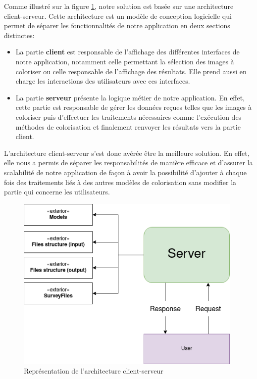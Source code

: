 \documentclass{article}
\begin{document}
Comme illustré sur la figure \ref{fig:clientserver}, notre solution est basée sur une architecture client-serveur. 
Cette architecture est un modèle de conception logicielle qui permet de séparer les fonctionnalités de notre application en deux sections distinctes: 
\begin{itemize}
    \item La partie \textbf{client} est responsable de l'affichage des différentes interfaces de notre application, notamment celle permettant la sélection des images à coloriser ou celle responsable de l'affichage des résultats.  Elle prend aussi en charge les interactions des utilisateurs avec ces interfaces.
    \item La partie \textbf{serveur} présente la logique métier de notre application. En effet, cette partie est responsable de gérer les données reçues telles que les images à coloriser puis d'effectuer les traitements nécessaires comme l'exécution des méthodes de colorisation et finalement renvoyer les résultats vers la partie client.
\end{itemize}

L'architecture client-serveur s'est donc avérée être la meilleure solution. En effet, elle nous a permis de séparer les responsabilités de manière efficace et d'assurer la scalabilité de notre application de façon à avoir la possibilité d'ajouter à chaque fois des traitements liés à des autres modèles de colorisation sans modifier la partie qui concerne les utilisateurs. \\

\begin{figure}[htp]
    \centering
    \includegraphics[width=11cm]{code-architecture-client-server.png}
    \caption{Représentation de l'architecture client-serveur}
    \label{fig:clientserver}
\end{figure}
\end{document}
